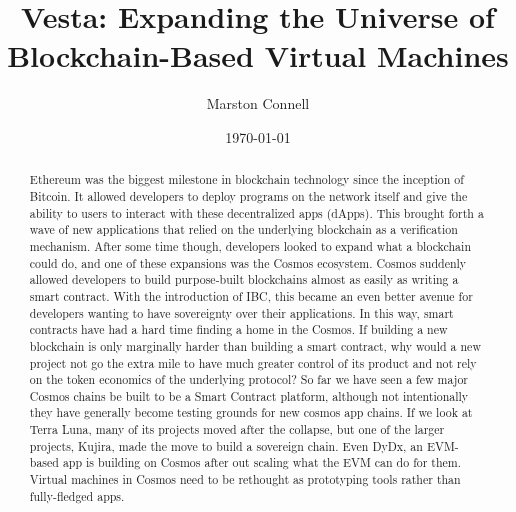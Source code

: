 \documentclass[a4paper]{article}
\begin{document}
\title{Vesta: Expanding the Universe of Blockchain-Based Virtual Machines}

\author{Marston Connell}

\date{\today}


\maketitle
\newpage


\begin{abstract}
  Ethereum was the biggest milestone in blockchain technology since the inception of Bitcoin.\cite{ethereum}
  It allowed developers to deploy programs on the network itself and give the ability to users to interact with these decentralized apps (dApps).
  This brought forth a wave of new applications that relied on the underlying blockchain as a verification mechanism.
  After some time though, developers looked to expand what a blockchain could do, and one of these expansions was the Cosmos ecosystem.
  Cosmos suddenly allowed developers to build purpose-built blockchains almost as easily as writing a smart contract.\cite{cosmos}
  With the introduction of IBC,\cite{ibc} this became an even better avenue for developers wanting to have sovereignty over their applications.
  In this way, smart contracts have had a hard time finding a home in the Cosmos.
  If building a new blockchain is only marginally harder than building a smart contract, why would a new project not go the extra mile to have much greater control of its product and not rely on the token economics of the underlying protocol?
  So far we have seen a few major Cosmos chains be built to be a Smart Contract platform, although not intentionally they have generally become testing grounds for new cosmos app chains.
  If we look at Terra Luna, many of its projects moved after the collapse, but one of the larger projects, Kujira, made the move to build a sovereign chain.
  Even DyDx, an EVM-based app is building on Cosmos after out scaling what the EVM can do for them.
  Virtual machines in Cosmos need to be rethought as prototyping tools rather than fully-fledged apps.
\end{abstract}

\newpage
\tableofcontents
\newpage
\end{document}
